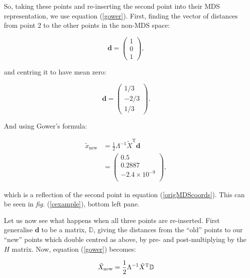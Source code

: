 \documentclass[a4paper,10pt]{amsart}
\newcommand{\fig}[1]{\emph{fig.} (\ref{#1})}
\newcommand{\tr}[1]{#1^{\text{T}}}
\newcommand{\cross}{\times}
\begin{document}
So, taking these points and re-inserting the second point into their MDS representation, we use equation (\ref{gower}). First, finding the vector of distances from point 2 to the other points in the non-MDS space:

\begin{equation*}
\mathbf{d}=\begin{pmatrix} 
	1\\
	0\\ 
	1
	\end{pmatrix},
\end{equation*}

and centring it to have mean zero:

\begin{equation*}
\mathbf{d}=\begin{pmatrix} 
	1/3\\
	-2/3\\ 
	1/3
	\end{pmatrix}.
\end{equation*}

And using Gower's formula:

\begin{equation*}
\begin{aligned}
\tilde{x}_{\text{new}} &= \frac{1}{2} \Lambda^{-1} \tr{\tilde{X}} \mathbf{d}\\
&=\begin{pmatrix}
0.5\\
0.2887\\
-2.4 \cross 10^{-9}\\
\end{pmatrix},
\end{aligned}
\end{equation*}

which is a reflection of the second point in equation (\ref{origMDScoords}). This can be seen in \fig{cexample}, bottom left pane.

Let us now see what happens when all three points are re-inserted. First generalise $\mathbf{d}$ to be a matrix, $\mathbb{D}$, giving the distances from the ``old'' points to our ``new'' points which double centred as above, by pre- and post-multiplying by the $H$ matrix. Now, equation (\ref{gower}) becomes:

\begin{equation*}
\tilde{X}_{\text{new}} = \frac{1}{2} \Lambda^{-1} \tr{\tilde{X}} \mathbb{D}\\
\end{equation*}
\end{document}
